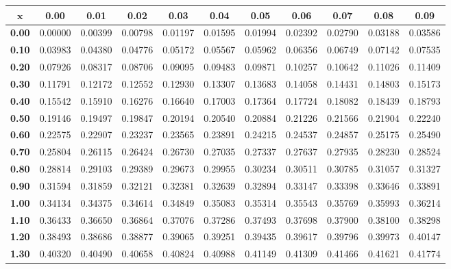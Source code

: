 \noindent \begin{tabular}{|c|c|c|c|c|c|c|c|c|c|c|}
\hline
$\pmb{x}$ & \textbf{ 0.00 } & \textbf{ 0.01 } & \textbf{ 0.02 } & \textbf{ 0.03 } & \textbf{ 0.04 } & \textbf{ 0.05 } & \textbf{ 0.06 } & \textbf{ 0.07 } & \textbf{ 0.08 } & \textbf{ 0.09 } \\ 
 \hline 
\textbf{ 0.00 } & 0.00000 & 0.00399 & 0.00798 & 0.01197 & 0.01595 & 0.01994 & 0.02392 & 0.02790 & 0.03188 & 0.03586\\ 
\hline
\textbf{ 0.10 } & 0.03983 & 0.04380 & 0.04776 & 0.05172 & 0.05567 & 0.05962 & 0.06356 & 0.06749 & 0.07142 & 0.07535\\ 
\hline
\textbf{ 0.20 } & 0.07926 & 0.08317 & 0.08706 & 0.09095 & 0.09483 & 0.09871 & 0.10257 & 0.10642 & 0.11026 & 0.11409\\ 
\hline
\textbf{ 0.30 } & 0.11791 & 0.12172 & 0.12552 & 0.12930 & 0.13307 & 0.13683 & 0.14058 & 0.14431 & 0.14803 & 0.15173\\ 
\hline
\textbf{ 0.40 } & 0.15542 & 0.15910 & 0.16276 & 0.16640 & 0.17003 & 0.17364 & 0.17724 & 0.18082 & 0.18439 & 0.18793\\ 
\hline
\textbf{ 0.50 } & 0.19146 & 0.19497 & 0.19847 & 0.20194 & 0.20540 & 0.20884 & 0.21226 & 0.21566 & 0.21904 & 0.22240\\ 
\hline
\textbf{ 0.60 } & 0.22575 & 0.22907 & 0.23237 & 0.23565 & 0.23891 & 0.24215 & 0.24537 & 0.24857 & 0.25175 & 0.25490\\ 
\hline
\textbf{ 0.70 } & 0.25804 & 0.26115 & 0.26424 & 0.26730 & 0.27035 & 0.27337 & 0.27637 & 0.27935 & 0.28230 & 0.28524\\ 
\hline
\textbf{ 0.80 } & 0.28814 & 0.29103 & 0.29389 & 0.29673 & 0.29955 & 0.30234 & 0.30511 & 0.30785 & 0.31057 & 0.31327\\ 
\hline
\textbf{ 0.90 } & 0.31594 & 0.31859 & 0.32121 & 0.32381 & 0.32639 & 0.32894 & 0.33147 & 0.33398 & 0.33646 & 0.33891\\ 
\hline
\textbf{ 1.00 } & 0.34134 & 0.34375 & 0.34614 & 0.34849 & 0.35083 & 0.35314 & 0.35543 & 0.35769 & 0.35993 & 0.36214\\ 
\hline
\textbf{ 1.10 } & 0.36433 & 0.36650 & 0.36864 & 0.37076 & 0.37286 & 0.37493 & 0.37698 & 0.37900 & 0.38100 & 0.38298\\ 
\hline
\textbf{ 1.20 } & 0.38493 & 0.38686 & 0.38877 & 0.39065 & 0.39251 & 0.39435 & 0.39617 & 0.39796 & 0.39973 & 0.40147\\ 
\hline
\textbf{ 1.30 } & 0.40320 & 0.40490 & 0.40658 & 0.40824 & 0.40988 & 0.41149 & 0.41309 & 0.41466 & 0.41621 & 0.41774\\ 

\end{tabular}
